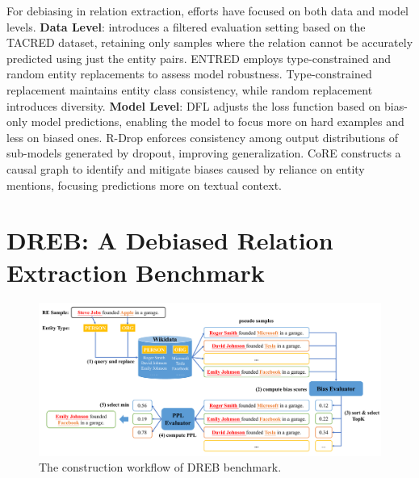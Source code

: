 \documentclass[letterpaper]{article} %
\begin{document}
For debiasing in relation extraction, efforts have focused on both data and model levels. \textbf{Data Level}: \cite{wang2022should} introduces a filtered evaluation setting based on the TACRED dataset, retaining only samples where the relation cannot be accurately predicted using just the entity pairs. ENTRED \cite{wang2023fragile} employs type-constrained and random entity replacements to assess model robustness. Type-constrained replacement maintains entity class consistency, while random replacement introduces diversity. \textbf{Model Level}: DFL \cite{mahabadi2020end} adjusts the loss function based on bias-only model predictions, enabling the model to focus more on hard examples and less on biased ones. R-Drop \cite{liang2021r} enforces consistency among output distributions of sub-models generated by dropout, improving generalization. CoRE \cite{wang2022should} constructs a causal graph to identify and mitigate biases caused by reliance on entity mentions, focusing predictions more on textual context.





\section{DREB: A Debiased Relation Extraction Benchmark}

\begin{figure}[ht]
    \centering
    \includegraphics[width=\linewidth]{figure/workflow.pdf}
    \caption{The construction workflow of DREB benchmark.}
    \label{fig:workflow}
\end{figure}
\end{document}
